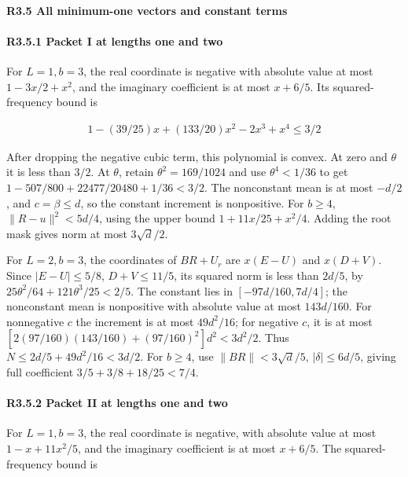 \paragraph{R3.5 All minimum-one vectors and constant terms}

\paragraph{R3.5.1 Packet I at lengths one and two}

For \(L=1,\allowbreak \allowbreak  b=3\), the real coordinate is negative with absolute value at most \(1-3x/2+x^2\), and the imaginary coefficient is at most \(x+6/5\). Its squared-frequency bound is

\[
\begin{gathered}
1-(39/25)x+(133/20)x^2-2x^3+x^4\le 3/2
\end{gathered}
\]

After dropping the negative cubic term, this polynomial is convex. At zero and \(\theta\) it is less than \(3/2\). At \(\theta\), retain \(\theta^2=169/1024\) and use \(\theta^4<1/36\) to get \(1-507/800+22477/20480+1/36<3/2\). The nonconstant mean is at most \(-d/2\), and \(c=\beta\le d\), so the constant increment is nonpositive. For \(b\ge4\), \(\|R-u\|^2<5d/4\), using the upper bound \(1+11x/25+x^2/4\). Adding the root mask gives norm at most \(3\sqrt d/2\).

For \(L=2,\allowbreak \allowbreak  b=3\), the coordinates of \(BR+U_r\) are \(x(E-U)\) and \(x(D+V)\). Since \(|E-U|\le5/8\), \(D+V\le11/5\), its squared norm is less than \(2d/5\), by \(25\theta^2/64+121\theta^3/25<2/5\). The constant lies in \([-97d/160,\allowbreak \allowbreak  7d/4]\); the nonconstant mean is nonpositive with absolute value at most \(143d/160\). For nonnegative \(c\) the increment is at most \(49d^2/16\); for negative \(c\), it is at most \([2(97/160)(143/160)+(97/160)^2]d^2<3d^2/2\). Thus \(N\le2d/5+49d^2/16<3d/2\). For \(b\ge4\), use \(\|BR\|<3\sqrt d/5\), \(|\delta|\le6d/5\), giving full coefficient \(3/5+3/8+18/25<7/4\).

\paragraph{R3.5.2 Packet II at lengths one and two}

For \(L=1,\allowbreak \allowbreak  b=3\), the real coordinate is negative, with absolute value at most \(1-x+11x^2/5\), and the imaginary coefficient is at most \(x+6/5\). The squared-frequency bound is

